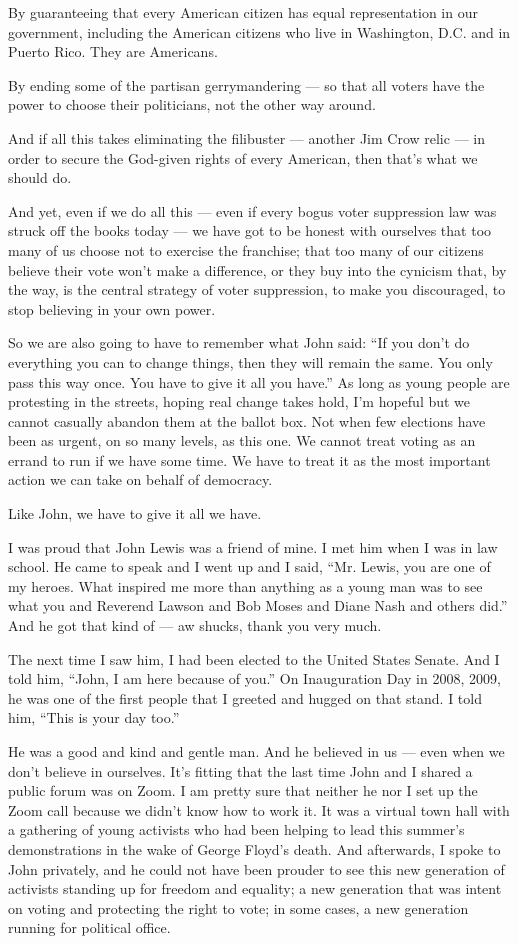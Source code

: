 By guaranteeing that every American citizen has equal representation in
our government, including the American citizens who live in Washington,
D.C. and in Puerto Rico. They are Americans.

By ending some of the partisan gerrymandering --- so that all voters
have the power to choose their politicians, not the other way around.

And if all this takes eliminating the filibuster --- another Jim Crow
relic --- in order to secure the God-given rights of every American,
then that's what we should do.

And yet, even if we do all this --- even if every bogus voter
suppression law was struck off the books today --- we have got to be
honest with ourselves that too many of us choose not to exercise the
franchise; that too many of our citizens believe their vote won't make a
difference, or they buy into the cynicism that, by the way, is the
central strategy of voter suppression, to make you discouraged, to stop
believing in your own power.

So we are also going to have to remember what John said: ``If you don't
do everything you can to change things, then they will remain the same.
You only pass this way once. You have to give it all you have.'' As long
as young people are protesting in the streets, hoping real change takes
hold, I'm hopeful but we cannot casually abandon them at the ballot box.
Not when few elections have been as urgent, on so many levels, as this
one. We cannot treat voting as an errand to run if we have some time. We
have to treat it as the most important action we can take on behalf of
democracy.

Like John, we have to give it all we have.

I was proud that John Lewis was a friend of mine. I met him when I was
in law school. He came to speak and I went up and I said, ``Mr. Lewis,
you are one of my heroes. What inspired me more than anything as a young
man was to see what you and Reverend Lawson and Bob Moses and Diane Nash
and others did.'' And he got that kind of --- aw shucks, thank you very
much.

The next time I saw him, I had been elected to the United States Senate.
And I told him, ``John, I am here because of you.'' On Inauguration Day
in 2008, 2009, he was one of the first people that I greeted and hugged
on that stand. I told him, ``This is your day too.''

He was a good and kind and gentle man. And he believed in us --- even
when we don't believe in ourselves. It's fitting that the last time John
and I shared a public forum was on Zoom. I am pretty sure that neither
he nor I set up the Zoom call because we didn't know how to work it. It
was a virtual town hall with a gathering of young activists who had been
helping to lead this summer's demonstrations in the wake of George
Floyd's death. And afterwards, I spoke to John privately, and he could
not have been prouder to see this new generation of activists standing
up for freedom and equality; a new generation that was intent on voting
and protecting the right to vote; in some cases, a new generation
running for political office.

